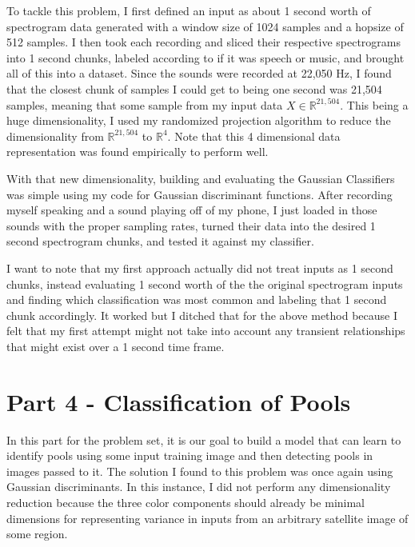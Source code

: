 \documentclass{article}[12pt]
\begin{document}
   To tackle this problem, I first defined an input as about 1 second worth of spectrogram data generated with a window size of 1024 samples and a hopsize of 512 samples. I then took each recording and sliced their respective spectrograms into 1 second chunks, labeled according to if it was speech or music, and brought all of this into a dataset. Since the sounds were recorded at 22,050 Hz, I found that the closest chunk of samples I could get to being one second was 21,504 samples, meaning that some sample from my input data $X \in \mathbb{R}^{21,504}$. This being a huge dimensionality, I used my randomized projection algorithm to reduce the dimensionality from $\mathbb{R}^{21,504}$ to $\mathbb{R}^{4}$. Note that this 4 dimensional data representation was found empirically to perform well.
   
   With that new dimensionality, building and evaluating the Gaussian Classifiers was simple using my code for Gaussian discriminant functions. After recording myself speaking and a sound playing off of my phone, I just loaded in those sounds with the proper sampling rates, turned their data into the desired 1 second spectrogram chunks, and tested it against my classifier. 

   I want to note that my first approach actually did not treat inputs as 1 second chunks, instead evaluating 1 second worth of the the original spectrogram inputs and finding which classification was most common and labeling that 1 second chunk accordingly. It worked but I ditched that for the above method because I felt that my first attempt might not take into account any transient relationships that might exist over a 1 second time frame. 

	\newpage
   \section{Part 4 - Classification of Pools}
   In this part for the problem set, it is our goal to build a model that can learn to identify pools using some input training image and then detecting pools in images passed to it. The solution I found to this problem was once again using Gaussian discriminants. In this instance, I did not perform any dimensionality reduction because the three color components should already be minimal dimensions for representing variance in inputs from an arbitrary satellite image of some region. 
   
\end{document}
